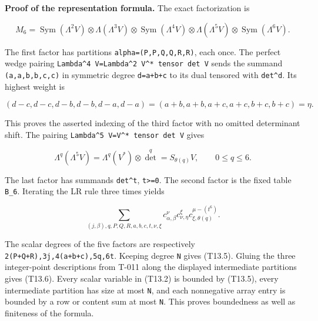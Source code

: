 \documentclass[
  10pt,
]{article}
\begin{document}
\textbf{Proof of the representation formula.} The exact factorization is

\[
M_6=\operatorname{Sym}(\Lambda^2V)\otimes\Lambda(\Lambda^3V)
\otimes\operatorname{Sym}(\Lambda^4V)\otimes\Lambda(\Lambda^5V)
\otimes\operatorname{Sym}(\Lambda^6V).
\]

The first factor has partitions
\texttt{\small alpha=\allowbreak{}(\allowbreak{}P,\allowbreak{}P,\allowbreak{}Q,\allowbreak{}Q,\allowbreak{}R,\allowbreak{}R)\allowbreak{}},
each once. The perfect wedge pairing
\texttt{\small Lambda\textasciicircum{}4 V=\allowbreak{}Lambda\textasciicircum{}2 V\textasciicircum{}* tensor det V}
sends the summand
\texttt{\small (\allowbreak{}a,\allowbreak{}a,\allowbreak{}b,\allowbreak{}b,\allowbreak{}c,\allowbreak{}c)\allowbreak{}}
in symmetric degree
\texttt{\small d=\allowbreak{}a+\allowbreak{}b+\allowbreak{}c} to its
dual tensored with \texttt{\small det\textasciicircum{}d}. Its highest
weight is

\[
(d-c,d-c,d-b,d-b,d-a,d-a)
=(a+b,a+b,a+c,a+c,b+c,b+c)=\eta.
\]

This proves the asserted indexing of the third factor with no omitted
determinant shift. The pairing
\texttt{\small Lambda\textasciicircum{}5 V=\allowbreak{}V\textasciicircum{}* tensor det V}
gives

\[
\Lambda^q(\Lambda^5V)=\Lambda^q(V^*)\otimes\det^q
=S_{\theta(q)}V,\qquad 0\le q\le6.
\]

The last factor has summands \texttt{\small det\textasciicircum{}t},
\texttt{\small t>=\allowbreak{}0}. The second factor is the fixed table
\texttt{\small B\_\allowbreak{}6}. Iterating the LR rule three times
yields

\[
\sum_{(j,\beta),q,P,Q,R,a,b,c,t,\nu,\xi}
c_{\alpha,\beta}^{\nu}
c_{\nu,\eta}^{\xi}
c_{\xi,\theta(q)}^{\mu-(t^6)}.
\]

The scalar degrees of the five factors are respectively
\texttt{\small 2(\allowbreak{}P+\allowbreak{}Q+\allowbreak{}R)\allowbreak{},\allowbreak{}3j,\allowbreak{}4(\allowbreak{}a+\allowbreak{}b+\allowbreak{}c)\allowbreak{},\allowbreak{}5q,\allowbreak{}6t}.
Keeping degree \texttt{\small N} gives (T13.5). Gluing the three
integer-point descriptions from T-011 along the displayed intermediate
partitions gives (T13.6). Every scalar variable in (T13.2) is bounded by
(T13.5), every intermediate partition has size at most
\texttt{\small N}, and each nonnegative array entry is bounded by a row
or content sum at most \texttt{\small N}. This proves boundedness as
well as finiteness of the formula.
\end{document}
